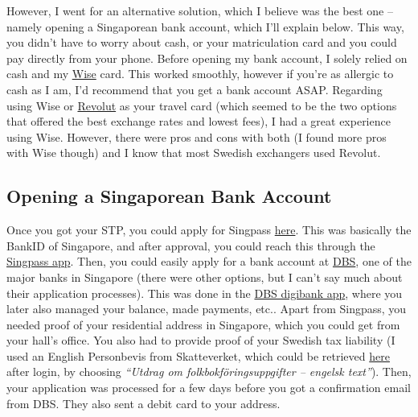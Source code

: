 However, I went for an alternative solution, which I believe was the best one -- namely opening a Singaporean bank account, which I'll explain below. This way, you didn't have to worry about cash, or your matriculation card and you could pay directly from your phone. Before opening my bank account, I solely relied on cash and my \href{https://wise.com}{Wise} card. This worked smoothly, however if you're as allergic to cash as I am, I'd recommend that you get a bank account ASAP. Regarding using Wise or \href{https://www.revolut.com/sv-SE/}{Revolut} as your travel card (which seemed to be the two options that offered the best exchange rates and lowest fees), I had a great experience using Wise. However, there were pros and cons with both (I found more pros with Wise though) and I know that most Swedish exchangers used Revolut.
\subsection*{Opening a Singaporean Bank Account}
{}
Once you got your STP, you could apply for Singpass \href{https://portal.singpass.gov.sg/home/ui/register/instructions}{here}. This was basically the BankID of Singapore, and after approval, you could reach this through the \href{https://www.google.com/url?sa=t&source=web&rct=j&opi=89978449&url=https://apps.apple.com/sg/app/singpass/id1340660807&ved=2ahUKEwj8ouKcoaWLAxVyUGcHHd3CKWgQFnoECBUQAQ&usg=AOvVaw2MU54ywzShBUAGdsGy2E40}{Singpass app}. Then, you could easily apply for a bank account at \href{https://www.dbs.com.sg/index/default.page}{DBS}, one of the major banks in Singapore (there were other options, but I can't say much about their application processes). This was done in the \href{https://www.google.com/url?sa=t&source=web&rct=j&opi=89978449&url=https://apps.apple.com/sg/app/dbs-digibank/id1068403826&ved=2ahUKEwjWjsikoqWLAxW2UGwGHWeHHRsQFnoECBcQAQ&usg=AOvVaw3MmyWfIWdIEfDqXsxZtKcG}{DBS digibank app}, where you later also managed your balance, made payments, etc.. Apart from Singpass, you needed proof of your residential address in Singapore, which you could get from your hall's office. You also had to provide proof of your Swedish tax liability (I used an English Personbevis from Skatteverket, which could be retrieved \href{https://www.skatteverket.se/privat/etjansterochblanketter/allaetjanster/tjanster/skrivutpersonbevis.4.18e1b10334ebe8bc80001262.html}{here} after login, by choosing \textit{``Utdrag om folkbokföringsuppgifter -- engelsk text''}). Then, your application was processed for a few days before you got a confirmation email from DBS. They also sent a debit card to your address. 


